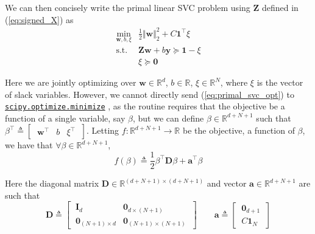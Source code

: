 \documentclass{article}
\numberwithin{equation}{section}
\newcommand{\minimize}{%
    \href{%
        https://docs.scipy.org/doc/scipy/reference/generated/%
        scipy.optimize.minimize.html%
    }{\texttt{scipy.optimize.minimize}}%
}
\begin{document}
We can then concisely write the primal linear SVC problem using
$ \mathbf{Z} $ defined in (\ref{eq:signed_X}) as
\begin{equation} \label{eq:primal_svc_opt}
    \begin{array}{ll}
        \displaystyle\min_{\mathbf{w}, b, \xi} &
            \frac{1}{2}\Vert\mathbf{w}\Vert_2^2 +
            C\mathbf{1}^\top\xi \\
        \text{s.t.} & \mathbf{Zw} + b\mathbf{y} \succeq
            \mathbf{1} - \xi  \\
            & \xi \succeq \mathbf{0}
    \end{array}
\end{equation}

Here we are jointly optimizing over $ \mathbf{w} \in \mathbb{R}^d $,
$ b \in \mathbb{R} $, $ \xi \in \mathbb{R}^N $, where $ \xi $ is the vector
of slack variables. However, we cannot directly send (\ref{eq:primal_svc_opt})
to \minimize, as the routine requires that the objective be a function of a
single variable, say $ \beta $, but we can define $ \beta \in
\mathbb{R}^{d + N + 1} $ such that $ \beta^\top \triangleq
\begin{bmatrix} \ \mathbf{w}^\top & b & \xi^\top \ \end{bmatrix} $. Letting
$ f : \mathbb{R}^{d + N + 1} \rightarrow \mathbb{R} $ be the objective, a
function of $ \beta $, we have that $ \forall \beta \in
\mathbb{R}^{d + N + 1} $,
\begin{equation} \label{eq:primal_obj_joint}
    f(\beta) \triangleq \frac{1}{2}\beta^\top\mathbf{D}\beta +
    \mathbf{a}^\top\beta
\end{equation}

Here the diagonal matrix $ \mathbf{D} \in \mathbb{R}^{(d + N + 1) \times
(d + N + 1)} $ and vector $ \mathbf{a} \in \mathbb{R}^{d + N + 1} $ are such
that
\begin{equation} \label{eq:primal_hess_and_lin_joint}
    \mathbf{D} \triangleq \begin{bmatrix}
        \ \mathbf{I}_d & \mathbf{0}_{d \times (N + 1)} \ \\
        \ \mathbf{0}_{(N + 1) \times d} & \mathbf{0}_{(N + 1) \times (N + 1)} \
    \end{bmatrix} \quad\quad \mathbf{a} \triangleq \begin{bmatrix}
        \ \mathbf{0}_{d + 1} \ \\ \ C\mathbf{1}_N \
    \end{bmatrix}
\end{equation}
\end{document}
